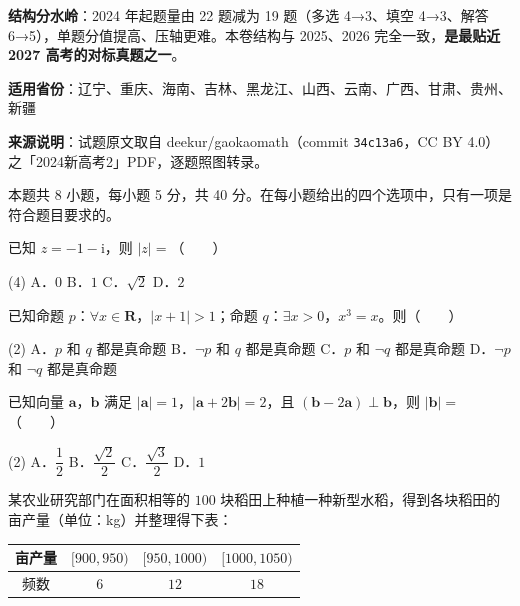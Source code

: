 

\begin{gknotice}
\textbf{结构分水岭}：2024 年起题量由 22 题减为 19 题（多选 4→3、填空 4→3、解答 6→5），单题分值提高、压轴更难。本卷结构与 2025、2026 完全一致，\textbf{是最贴近 2027 高考的对标真题之一}。

\textbf{适用省份}：辽宁、重庆、海南、吉林、黑龙江、山西、云南、广西、甘肃、贵州、新疆

\textbf{来源说明}：试题原文取自 deekur/gaokaomath（commit \texttt{34c13a6}，CC BY 4.0）之「2024新高考2」PDF，逐题照图转录。
\end{gknotice}

\par\medskip


\begin{gktip}
本题共 8 小题，每小题 5 分，共 40 分。在每小题给出的四个选项中，只有一项是符合题目要求的。
\end{gktip}

已知 $z=-1-\mathrm i$，则 $|z|=$（　　）

\begin{gkopts}(4)
\task A．$0$
\task B．$1$
\task C．$\sqrt2$
\task D．$2$
\end{gkopts}

已知命题 $p$：$\forall x\in\mathbf R$，$|x+1|>1$；命题 $q$：$\exists x>0$，$x^{3}=x$。则（　　）

\begin{gkopts}(2)
\task A．$p$ 和 $q$ 都是真命题
\task B．$\neg p$ 和 $q$ 都是真命题
\task C．$p$ 和 $\neg q$ 都是真命题
\task D．$\neg p$ 和 $\neg q$ 都是真命题
\end{gkopts}

已知向量 $\boldsymbol a$，$\boldsymbol b$ 满足 $|\boldsymbol a|=1$，$|\boldsymbol a+2\boldsymbol b|=2$，且 $(\boldsymbol b-2\boldsymbol a)\perp\boldsymbol b$，则 $|\boldsymbol b|=$（　　）

\begin{gkopts}(2)
\task A．$\dfrac12$
\task B．$\dfrac{\sqrt2}2$
\task C．$\dfrac{\sqrt3}2$
\task D．$1$
\end{gkopts}

某农业研究部门在面积相等的 $100$ 块稻田上种植一种新型水稻，得到各块稻田的亩产量（单位：kg）并整理得下表：

\begin{center}
\begin{tabular}{cccc}
\toprule
亩产量 & $[900,950)$ & $[950,1000)$ & $[1000,1050)$ \\
\midrule
频数 & $6$ & $12$ & $18$ \\
\bottomrule
\end{tabular}
\end{center}

